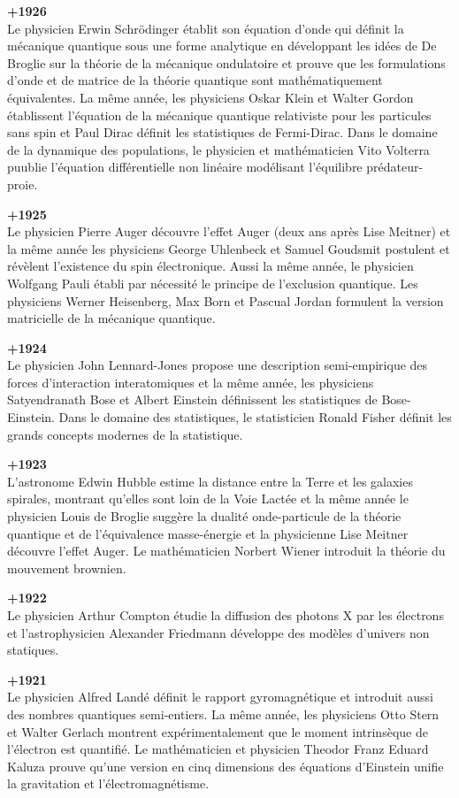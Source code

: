 \textbf{+1926}\\
Le physicien Erwin Schrödinger établit son équation d'onde qui définit la mécanique quantique sous une forme analytique en développant les idées de De Broglie sur la théorie de la mécanique ondulatoire et prouve que les formulations d'onde et de matrice de la théorie quantique sont mathématiquement équivalentes. La même année, les physiciens Oskar Klein et Walter Gordon établissent l'équation de la mécanique quantique relativiste pour les particules sans spin et Paul Dirac définit les statistiques de Fermi-Dirac. Dans le domaine de la dynamique des populations, le physicien et mathématicien Vito Volterra puublie l'équation différentielle non linéaire modélisant l'équilibre prédateur-proie.

\textbf{+1925}\\
Le physicien Pierre Auger découvre l'effet Auger (deux ans après Lise Meitner) et la même année les physiciens George Uhlenbeck et Samuel Goudsmit postulent et révèlent l'existence du spin électronique. Aussi la même année, le physicien Wolfgang Pauli établi par nécessité le principe de l'exclusion quantique. Les physiciens Werner Heisenberg, Max Born et Pascual Jordan formulent la version matricielle de la mécanique  quantique.

\textbf{+1924}\\
Le physicien John Lennard-Jones propose une description semi-empirique des forces d'interaction interatomiques et la même année, les physiciens Satyendranath Bose et Albert Einstein définissent les statistiques de Bose-Einstein. Dans le domaine des statistiques, le statisticien Ronald Fisher définit les grands concepts modernes de la statistique.

\textbf{+1923}\\
L'astronome Edwin Hubble estime la distance entre la Terre et les galaxies spirales, montrant qu'elles sont loin de la Voie Lactée et la même année le physicien Louis de Broglie suggère la dualité onde-particule de la théorie quantique et de l'équivalence masse-énergie et la physicienne Lise Meitner découvre l'effet Auger. Le mathématicien Norbert Wiener introduit la théorie du mouvement brownien.

\textbf{+1922}\\
Le physicien Arthur Compton étudie la diffusion des photons X par les électrons et l'astrophysicien Alexander Friedmann développe des modèles d'univers non statiques.

\textbf{+1921}\\
Le physicien Alfred Landé définit le rapport gyromagnétique et introduit aussi des nombres quantiques semi-entiers. La même année, les physiciens Otto Stern et Walter Gerlach montrent expérimentalement que le moment intrinsèque de l'électron est quantifié. Le mathématicien et physicien Theodor Franz Eduard Kaluza prouve qu'une version en cinq dimensions des équations d'Einstein unifie la gravitation et l'électromagnétisme.

